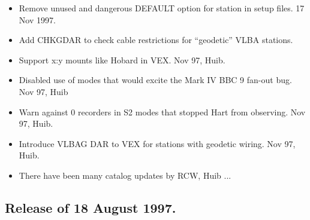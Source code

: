 \documentclass{report}
\begin{document}
\begin{itemize}
\item Remove unused and dangerous DEFAULT option for station in
      setup files.  17 Nov 1997.

\item Add CHKGDAR to check cable restrictions for ``geodetic'' VLBA
      stations.

\item Support x:y mounts like Hobard in VEX.  Nov 97, Huib.

\item Disabled use of modes that would excite the Mark IV BBC 9
      fan-out bug.  Nov 97, Huib

\item Warn against 0 recorders in S2 modes that stopped Hart from
      observing.  Nov 97, Huib.

\item Introduce VLBAG DAR to VEX for stations with geodetic wiring.
      Nov 97, Huib.

\item There have been many catalog updates by RCW, Huib ...

\end{itemize}

\subsection{\label{SSSEC:18AUG97}Release of 18 August 1997.}
\end{document}
